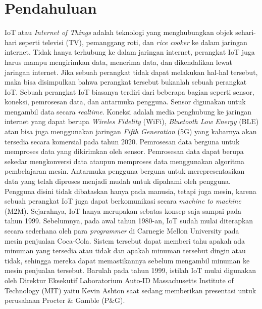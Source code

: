 \documentclass[12pt, letterpaper]{article}
\begin{document}
\section*{Pendahuluan}
IoT atau \textit{Internet of Things} adalah teknologi yang menghubungkan objek sehari-hari seperti televisi (TV), pemanggang roti, dan \textit{rice cooker} ke dalam jaringan internet.\cite{techtarget20} Tidak hanya terhubung ke dalam jaringan internet, perangkat IoT juga harus mampu mengirimkan data, menerima data, dan dikendalikan lewat jaringan internet. Jika sebuah perangkat tidak dapat melakukan hal-hal tersebut, maka bisa disimpulkan bahwa perangkat tersebut bukanlah sebuah perangkat IoT.
\newline
\indent
Sebuah perangkat IoT biasanya terdiri dari beberapa bagian seperti sensor, koneksi, pemrosesan data, dan antarmuka pengguna.\cite{dflair18} Sensor digunakan untuk mengambil data secara \textit{realtime}. Koneksi adalah media penghubung ke jaringan internet yang dapat berupa \textit{Wireles Fidelity} (WiFi), \textit{Bluetooth Low Energy} (BLE) atau bisa juga menggunakan jaringan \textit{Fifth Generation} (5G) yang kabarnya akan tersedia secara komersial pada tahun 2020.\cite{erricson17} Pemrosesan data berguna untuk memproses data yang
dikirimkan oleh sensor. Pemrosesan data dapat berupa sekedar mengkonversi data ataupun memproses data menggunakan algoritma pembelajaran mesin. Antarmuka pengguna berguna untuk merepresentasikan data yang telah diproses menjadi mudah untuk dipahami oleh pengguna. Pengguna disini tidak dibataskan hanya pada manusia, tetapi juga mesin, karena sebuah perangkat IoT juga dapat berkomunikasi secara \textit{machine to machine} (M2M).
\newline
\indent
Sejarahnya, IoT hanya merupakan sebatas konsep saja sampai pada tahun 1999.\cite{dversity16} Sebelumnya, pada awal tahun 1980-an, IoT sudah mulai diterapkan secara sederhana oleh para \textit{programmer} di Carnegie Mellon University pada mesin penjualan Coca-Cola. Sistem tersebut dapat memberi tahu apakah ada minuman yang tersedia atau tidak dan apakah minuman tersebut dingin atau tidak, sehingga mereka dapat memastikannya sebelum mengambil minuman ke mesin penjualan tersebut. Barulah pada tahun 1999, istilah IoT mulai digunakan
oleh Direktur Eksekutif Laboratorium Auto-ID Massachusetts Institute of Technology (MIT) yaitu Kevin Ashton saat sedang memberikan presentasi untuk perusahaan Procter \& Gamble (P\&G).

\newpage
\printbibliography[title=Daftar Pustaka]
\end{document}
